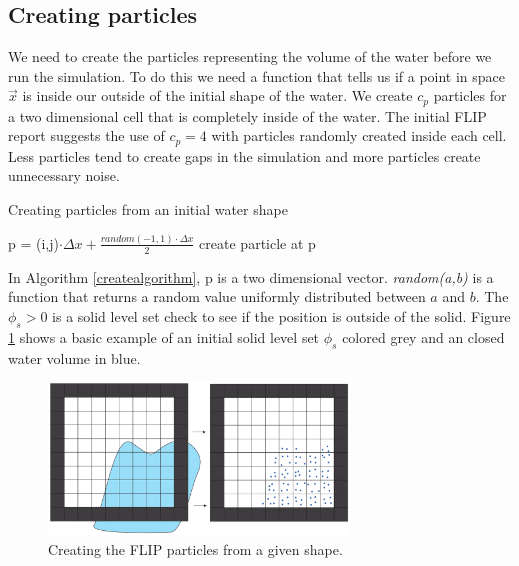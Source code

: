 \subsection{Creating particles}

We need to create the particles representing the volume of the water before we run the simulation. To do this we need a function that tells us if a point in space $\vec{x}$ is inside our outside of the initial shape of the water.  We create $c_p$ particles for a two dimensional cell that is completely inside of the water. The initial FLIP report suggests the use of $c_p = 4$ with particles randomly created inside each cell. Less particles tend to create gaps in the simulation and more particles create unnecessary noise. 

\begin{algorithm}
\caption{Creating particles from an initial water shape}
\begin{algorithmic}
\STATE p = (i,j)$\cdot \Delta x +\frac{random(-1,1) \cdot \Delta x}{2}$
\STATE create particle at p
\ENDIF
\ENDFOR
\ENDFOR
\ENDFOR
\end{algorithmic}
\label{createalgorithm}
\end{algorithm}
\noindent
In Algorithm \ref{createalgorithm}, p is a two dimensional vector. {\it random(a,b)} is a function that returns a random value uniformly distributed between $a$ and $b$. The $\phi_s > 0$ is a solid level set check to see if the position is outside of the solid. Figure \ref{createexample} shows a basic example of an initial solid level set $\phi_s$ colored grey and an closed water volume in blue.

\begin{figure}[ht!]
\centering
\includegraphics[width=80mm]{img/create.pdf}
\caption{Creating the FLIP particles from a given shape.}
\label{createexample}
\end{figure}


